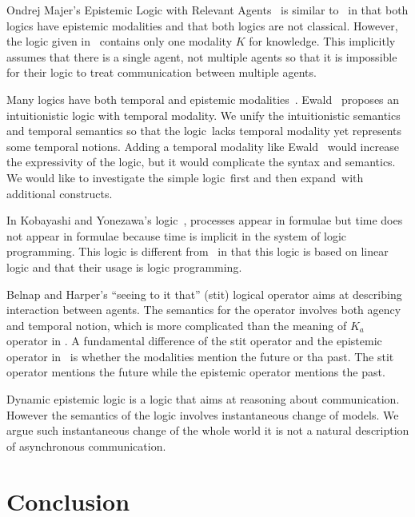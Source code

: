  Ondrej Majer's
 Epistemic Logic with Relevant Agents~\cite{majer-epistemic}
 is similar to \iec\, in that both logics have epistemic modalities and that both logics are
 not classical.
 However, the logic given in~\cite{majer-epistemic}
 contains only one modality $K$ for knowledge.
 This implicitly assumes that there is a single agent, not multiple agents so that it is
 impossible for their logic to treat communication between multiple agents.

 Many logics have both temporal and epistemic modalities~\cite{sato13study, wozna2005logic}.
 Ewald~\cite{1986} proposes an intuitionistic logic with temporal modality.
 We unify the intuitionistic semantics and temporal semantics so that the logic
 \iec\,lacks temporal modality yet represents some temporal notions.
 Adding a temporal modality like Ewald~\cite{1986} would increase the expressivity of the
 logic, but it would complicate the syntax and semantics.
 We would like to investigate the simple logic \iec\,first
 and then expand \iec\,with
 additional constructs.

 In Kobayashi and Yonezawa's logic~\cite{kobayashi1995asynchronous}, processes
 appear in formulae but time does not appear in formulae
 because time is implicit in the system of logic programming.
 This logic is different from \iec\, in that this logic is based on linear logic and that their
 usage is logic programming.

 Belnap and Harper's ``seeing to it that'' (stit) logical operator
 aims at describing interaction between agents.
 The semantics for the operator involves both agency and temporal notion, which is more
 complicated than the meaning of $K_a$ operator in \iec.
 A fundamental difference of the stit operator and the epistemic operator in \iec\,
 is whether the modalities mention the future or tha past.
 The stit operator mentions the future while the epistemic operator mentions the past.

 Dynamic epistemic logic is a logic that aims at reasoning about communication.
 However the semantics of the logic involves
 instantaneous change of models.
 We argue such instantaneous change of the whole world it is
 not a natural description of asynchronous communication.


 \section{Conclusion}
 \label{conclusion}



